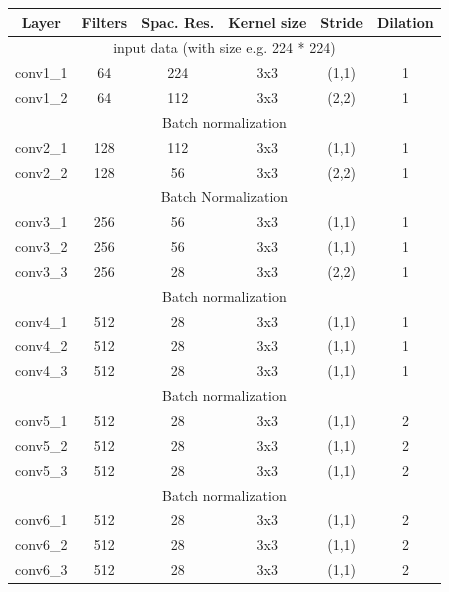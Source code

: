 \documentclass[twoside,twocolumn]{article}
\begin{document}
\begin{table} [h!]
\centering
\label{tab:network}
\setlength{\arrayrulewidth}{0.25mm}
\setlength{\tabcolsep}{15pt}
\renewcommand{\arraystretch}{1}
\begin{tabular}{|c|c|c|c|c|c|}

	\hline
	\rowcolor{gray!30}
	\textbf{Layer} & \textbf{Filters} & \textbf{Spac. Res.} & \textbf{Kernel size} & \textbf{Stride} & \textbf{Dilation}\\
	\hline
	\hline
	\multicolumn{6}{|c|}{input data (with size e.g. 224 * 224)}\\ \hline
	\rowcolor{gray!15}
	conv1\_1 & 64 & 224 & 3x3 & (1,1) & 1 \\ 
	conv1\_2 & 64 & 112 & 3x3 & (2,2) & 1 \\ \hline
	\multicolumn{6}{|c|}{Batch normalization}\\ \hline
	\rowcolor{gray!15}
	conv2\_1 & 128 & 112 & 3x3 & (1,1) & 1 \\ 
	conv2\_2 & 128 & 56 & 3x3 & (2,2) & 1 \\ \hline
	\multicolumn{6}{|c|}{Batch Normalization}\\ \hline
	\rowcolor{gray!15}
	conv3\_1 & 256 & 56 & 3x3 & (1,1) & 1 \\ 
	conv3\_2 & 256 & 56 & 3x3 & (1,1) & 1 \\ 
	\rowcolor{gray!15}
	conv3\_3 & 256 & 28 & 3x3 & (2,2) & 1 \\ \hline
	\multicolumn{6}{|c|}{Batch normalization}\\ \hline
	\rowcolor{gray!15}
	conv4\_1 & 512 & 28 & 3x3 & (1,1) & 1 \\ 
	conv4\_2 & 512 & 28 & 3x3 & (1,1) & 1 \\ 
	\rowcolor{gray!15}
	conv4\_3 & 512 & 28 & 3x3 & (1,1) & 1 \\ \hline
	\multicolumn{6}{|c|}{Batch normalization}\\ \hline
	\rowcolor{gray!15}
	conv5\_1 & 512 & 28 & 3x3 & (1,1) & 2 \\ 
	conv5\_2 & 512 & 28 & 3x3 & (1,1) & 2 \\ 
	\rowcolor{gray!15}
	conv5\_3 & 512 & 28 & 3x3 & (1,1) & 2 \\ \hline
	\multicolumn{6}{|c|}{Batch normalization}\\ \hline
	\rowcolor{gray!15}
	conv6\_1 & 512 & 28 & 3x3 & (1,1) & 2 \\ 
	conv6\_2 & 512 & 28 & 3x3 & (1,1) & 2 \\ 
	\rowcolor{gray!15}
	conv6\_3 & 512 & 28 & 3x3 & (1,1) & 2 \\ \hline

\end{tabular}
\end{table}
\end{document}
